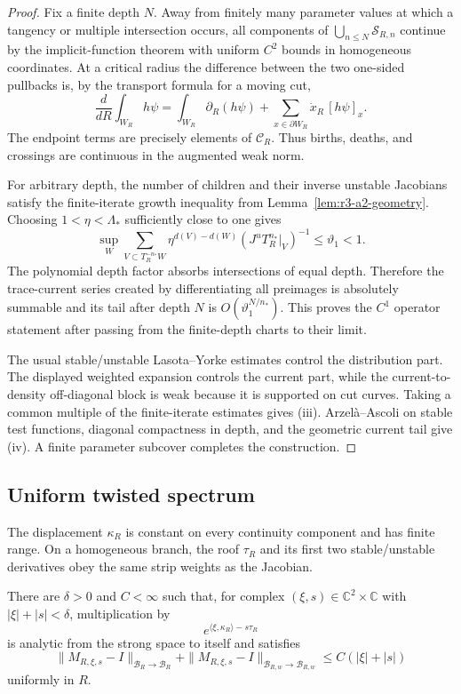 \begin{proof}
Fix a finite depth \(N\).  Away from finitely many parameter values at which a
tangency or multiple intersection occurs, all components of
\(\bigcup_{n\le N}\mathscr S_{R,n}\) continue by the implicit-function
theorem with uniform \(C^2\) bounds in homogeneous coordinates.  At a critical
radius the difference between the two one-sided pullbacks is, by the transport
formula for a moving cut,
\[
 \frac d{dR}\int_{W_R}h\psi
 =\int_{W_R}\partial_R(h\psi)
  +\sum_{x\in\partial W_R}
  \dot x_R\,[h\psi]_x .
\]
The endpoint terms are precisely elements of \(\mathcal C_R\).  Thus births,
deaths, and crossings are continuous in the augmented weak norm.

For arbitrary depth, the number of children and their inverse unstable
Jacobians satisfy the finite-iterate growth inequality from
Lemma~\ref{lem:r3-a2-geometry}.  Choosing
\(1<\eta<\Lambda_*\) sufficiently close to one gives
\[
 \sup_W\sum_{V\subset T_R^{-n_*}W}
 \eta^{d(V)-d(W)}(J^uT_R^{n_*}|_V)^{-1}
 \le\vartheta_1<1.
\]
The polynomial depth factor absorbs intersections of equal depth.  Therefore
the trace-current series created by differentiating all preimages is
absolutely summable and its tail after depth \(N\) is \(O(\vartheta_1^{N/n_*})\).
This proves the \(C^1\) operator statement after passing from the finite-depth
charts to their limit.

The usual stable/unstable Lasota--Yorke estimates control the distribution
part.  The displayed weighted expansion controls the current part, while the
current-to-density off-diagonal block is weak because it is supported on cut
curves.  Taking a common multiple of the finite-iterate estimates gives (iii).
Arzel\`a--Ascoli on stable test functions, diagonal compactness in depth, and
the geometric current tail give (iv).  A finite parameter subcover completes
the construction.
\end{proof}

\subsection{Uniform twisted spectrum}

The displacement \(\kappa_R\) is constant on every continuity component and
has finite range.  On a homogeneous branch, the roof \(\tau_R\) and its first
two stable/unstable derivatives obey the same strip weights as the Jacobian.

\begin{lemma}
\label{lem:r3-a2-multiplier}
There are \(\delta>0\) and \(C<\infty\) such that, for complex
\((\xi,s)\in\mathbb C^2\times\mathbb C\) with
\(|\xi|+|s|<\delta\), multiplication by
\[
 e^{\langle\xi,\kappa_R\rangle-s\tau_R}
\]
is analytic from the strong space to itself and satisfies
\[
 \|M_{R,\xi,s}-I\|_{\mathcal B_R\to\mathcal B_R}
 +\|M_{R,\xi,s}-I\|_{\mathcal B_{R,w}\to\mathcal B_{R,w}}
 \le C(|\xi|+|s|)
\]
uniformly in \(R\).
\end{lemma}

